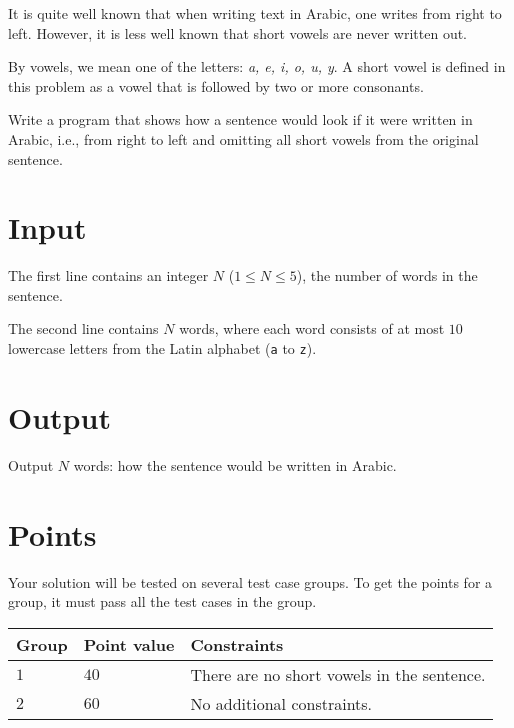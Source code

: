 \noindent
It is quite well known that when writing text in Arabic, one writes from right to left.
However, it is less well known that short vowels are never written out.

By vowels, we mean one of the letters: \textit{a, e, i, o, u, y}.
A short vowel is defined in this problem as a vowel that is followed by two or more consonants.

Write a program that shows how a sentence would look if it were written in Arabic, i.e., from right to left and omitting all short vowels from the original sentence.

\section*{Input}
The first line contains an integer $N$ ($1 \le N \le 5$), the number of words in the sentence.

The second line contains $N$ words, where each word consists of at most $10$ lowercase letters from the Latin alphabet (\texttt{a} to \texttt{z}).

\section*{Output}
Output $N$ words: how the sentence would be written in Arabic.

\section*{Points}
Your solution will be tested on several test case groups.
To get the points for a group, it must pass all the test cases in the group.

\noindent
\begin{tabular}{| l | l | p{12cm} |}
  \hline
  \textbf{Group} & \textbf{Point value} & \textbf{Constraints} \\ \hline
  $1$   & $40$        & There are no short vowels in the sentence. \\ \hline
  $2$   & $60$        & No additional constraints. \\ \hline
\end{tabular}